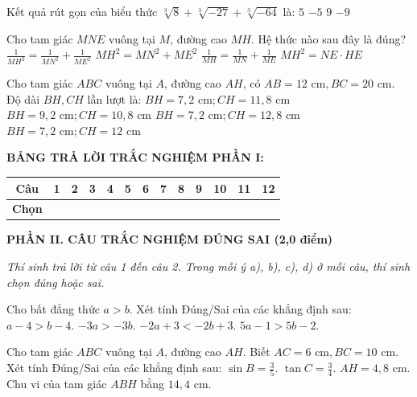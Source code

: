 \documentclass[12pt,a4paper]{article}
\begin{document}
\begin{ex}
Kết quả rút gọn của biểu thức $\sqrt[3]{8} + \sqrt[3]{-27} + \sqrt[3]{-64}$ là:
\choice
{$5$}
{\True $-5$}
{$9$}
{$-9$}
\end{ex}

\begin{ex}
Cho tam giác $MNE$ vuông tại $M$, đường cao $MH$. Hệ thức nào sau đây là đúng?
\choice
{\True $\frac{1}{MH^2} = \frac{1}{MN^2} + \frac{1}{ME^2}$}
{$MH^2 = MN^2 + ME^2$}
{$\frac{1}{MH} = \frac{1}{MN} + \frac{1}{ME}$}
{$MH^2 = NE \cdot HE$}
\end{ex}

\begin{ex}
Cho tam giác $ABC$ vuông tại $A$, đường cao $AH$, có $AB = 12\text{ cm}, BC = 20\text{ cm}$. Độ dài $BH, CH$ lần lượt là:
\choice
{$BH = 7{,}2\text{ cm}; CH = 11{,}8\text{ cm}$}
{$BH = 9{,}2\text{ cm}; CH = 10{,}8\text{ cm}$}
{\True $BH = 7{,}2\text{ cm}; CH = 12{,}8\text{ cm}$}
{$BH = 7{,}2\text{ cm}; CH = 12\text{ cm}$}
\end{ex}


\vspace{1mm}
\noindent\textbf{BẢNG TRẢ LỜI TRẮC NGHIỆM PHẦN I:}
\begin{center}
\begin{tabular}{|c|c|c|c|c|c|c|c|c|c|c|c|c|}
\hline
\textbf{Câu} & \textbf{1} & \textbf{2} & \textbf{3} & \textbf{4} & \textbf{5} & \textbf{6} & \textbf{7} & \textbf{8} & \textbf{9} & \textbf{10} & \textbf{11} & \textbf{12} \\
\hline
\textbf{Chọn} & \rule{0pt}{0.65cm} & & & & & & & & & & & \\
\hline
\end{tabular}
\end{center}
\vspace{2mm}

\noindent\textbf{\large PHẦN II. CÂU TRẮC NGHIỆM ĐÚNG SAI (2,0 điểm)}

\textit{Thí sinh trả lời từ câu 1 đến câu 2. Trong mỗi ý a), b), c), d) ở mỗi câu, thí sinh chọn đúng hoặc sai.}

\vspace{1mm}
\begin{ex}
Cho bất đẳng thức $a > b$. Xét tính Đúng/Sai của các khẳng định sau:
\choiceTF
{\True $a - 4 > b - 4$.}
{$-3a > -3b$.}
{\True $-2a + 3 < -2b + 3$.}
{\True $5a - 1 > 5b - 2$.}
\end{ex}

\begin{ex}
Cho tam giác $ABC$ vuông tại $A$, đường cao $AH$. Biết $AC = 6\text{ cm}, BC = 10\text{ cm}$. Xét tính Đúng/Sai của các khẳng định sau:
\choiceTF
{\True $\sin B = \frac{3}{5}$.}
{$\tan C = \frac{3}{4}$.}
{\True $AH = 4{,}8\text{ cm}$.}
{Chu vi của tam giác $ABH$ bằng $14{,}4\text{ cm}$.}
\end{ex}
\end{document}
